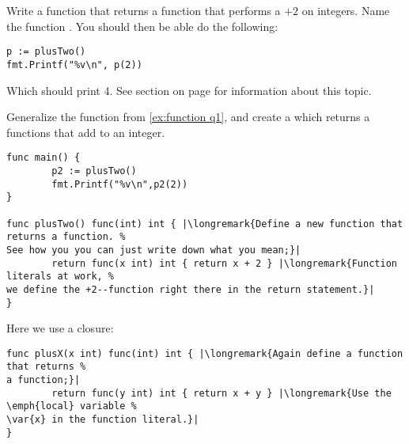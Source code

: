 \begin{Exercise}[title={Functions that return functions},difficulty=6]
\label{ex:function}
\Question\label{ex:function q1} Write a function that returns a function
that performs a $+2$ on integers. Name the function .
You should then be able do the following:
\begin{lstlisting}
p := plusTwo()
fmt.Printf("%v\n", p(2))
\end{lstlisting}
Which should print 4.
See section  on page \pageref{sec:callbacks} for information
about this topic.

\Question\label{ex:function q2} Generalize the function from \ref{ex:function q1},
and create a  which returns a functions that add  to an
integer.
\end{Exercise}

\begin{Answer}
\Question
\begin{lstlisting}
func main() {
        p2 := plusTwo()
        fmt.Printf("%v\n",p2(2))
}

func plusTwo() func(int) int { |\longremark{Define a new function that returns a function. %
See how you you can just write down what you mean;}|
        return func(x int) int { return x + 2 } |\longremark{Function literals at work, %
we define the +2--function right there in the return statement.}|
}
\end{lstlisting}
\showremarks

\Question
Here we use a closure:
\begin{lstlisting}
func plusX(x int) func(int) int { |\longremark{Again define a function that returns %
a function;}|
        return func(y int) int { return x + y } |\longremark{Use the \emph{local} variable %
\var{x} in the function literal.}|
}
\end{lstlisting}
\showremarks
\end{Answer}
